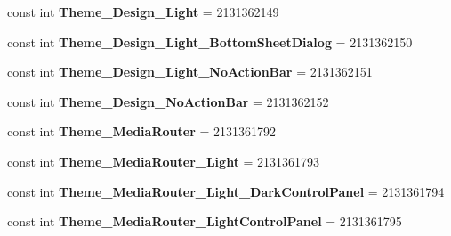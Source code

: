 \begin{DoxyCompactItemize}
const int {\bfseries Theme\+\_\+\+Design\+\_\+\+Light} = 2131362149
\item 
\mbox{\label{class_pinned_app_1_1_droid_1_1_resource_1_1_style_ade4c2b6e1421def04bdb4be35a79dfa4}} 
const int {\bfseries Theme\+\_\+\+Design\+\_\+\+Light\+\_\+\+Bottom\+Sheet\+Dialog} = 2131362150
\item 
\mbox{\label{class_pinned_app_1_1_droid_1_1_resource_1_1_style_a0f8a6904173030ce9e707609030de52b}} 
const int {\bfseries Theme\+\_\+\+Design\+\_\+\+Light\+\_\+\+No\+Action\+Bar} = 2131362151
\item 
\mbox{\label{class_pinned_app_1_1_droid_1_1_resource_1_1_style_a74d54e453966bc59e53872200448e1a3}} 
const int {\bfseries Theme\+\_\+\+Design\+\_\+\+No\+Action\+Bar} = 2131362152
\item 
\mbox{\label{class_pinned_app_1_1_droid_1_1_resource_1_1_style_a5dbe7d66b6a4caaf12a5c0a368d27b2c}} 
const int {\bfseries Theme\+\_\+\+Media\+Router} = 2131361792
\item 
\mbox{\label{class_pinned_app_1_1_droid_1_1_resource_1_1_style_af5ec53231b849270da84cbbad95ac149}} 
const int {\bfseries Theme\+\_\+\+Media\+Router\+\_\+\+Light} = 2131361793
\item 
\mbox{\label{class_pinned_app_1_1_droid_1_1_resource_1_1_style_abf4447ab7923100098152a2de9ef1608}} 
const int {\bfseries Theme\+\_\+\+Media\+Router\+\_\+\+Light\+\_\+\+Dark\+Control\+Panel} = 2131361794
\item 
\mbox{\label{class_pinned_app_1_1_droid_1_1_resource_1_1_style_ab3054189fe459d43574890f682e58741}} 
const int {\bfseries Theme\+\_\+\+Media\+Router\+\_\+\+Light\+Control\+Panel} = 2131361795
\item 
\mbox{\label{class_pinned_app_1_1_droid_1_1_resource_1_1_style_a78ec303dc066c649ccb881787e118e02}} 

\end{DoxyCompactItemize}
